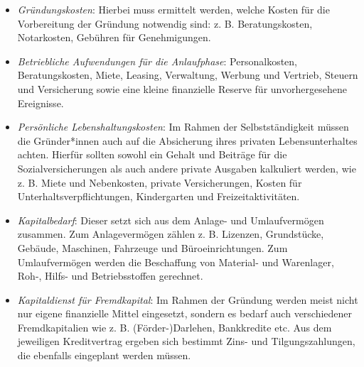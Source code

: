 \documentclass[
  letterpaper,
]{book}
\begin{document}
\begin{itemize}
\item
  \emph{Gründungskosten}: Hierbei muss ermittelt werden, welche Kosten
  für die Vorbereitung der Gründung notwendig sind: z. B.
  Beratungskosten, Notarkosten, Gebühren für Genehmigungen.
\item
  \emph{Betriebliche Aufwendungen für die Anlaufphase}: Personalkosten,
  Beratungskosten, Miete, Leasing, Verwaltung, Werbung und Vertrieb,
  Steuern und Versicherung sowie eine kleine finanzielle Reserve für
  unvorhergesehene Ereignisse.
\item
  \emph{Persönliche Lebenshaltungskosten}: Im Rahmen der
  Selbstständigkeit müssen die Gründer*innen auch auf die Absicherung
  ihres privaten Lebensunterhaltes achten. Hierfür sollten sowohl ein
  Gehalt und Beiträge für die Sozialversicherungen als auch andere
  private Ausgaben kalkuliert werden, wie z. B. Miete und Nebenkosten,
  private Versicherungen, Kosten für Unterhaltsverpflichtungen,
  Kindergarten und Freizeitaktivitäten.
\item
  \emph{Kapitalbedarf}: Dieser setzt sich aus dem Anlage- und
  Umlaufvermögen zusammen. Zum Anlagevermögen zählen z. B. Lizenzen,
  Grundstücke, Gebäude, Maschinen, Fahrzeuge und Büroeinrichtungen. Zum
  Umlaufvermögen werden die Beschaffung von Material- und Warenlager,
  Roh-, Hilfs- und Betriebsstoffen gerechnet.
\item
  \emph{Kapitaldienst für Fremdkapital}: Im Rahmen der Gründung werden
  meist nicht nur eigene finanzielle Mittel eingesetzt, sondern es
  bedarf auch verschiedener Fremdkapitalien wie z. B. (Förder-)Darlehen,
  Bankkredite etc. Aus dem jeweiligen Kreditvertrag ergeben sich
  bestimmt Zins- und Tilgungszahlungen, die ebenfalls eingeplant werden
  müssen.
\end{itemize}
\end{document}
